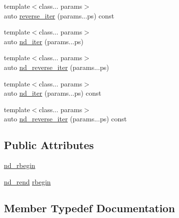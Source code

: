 \begin{DoxyCompactItemize}
\item 
{\footnotesize template$<$class... params$>$ }\\auto \hyperlink{classBC_1_1tensors_1_1Tensor__IterAlgos_abbc5cde5739934f3a303e2cbd03e95c5}{reverse\+\_\+iter} (params...\+ps) const 
\item 
{\footnotesize template$<$class... params$>$ }\\auto \hyperlink{classBC_1_1tensors_1_1Tensor__IterAlgos_a31a31f7f95cda12e59c24e9c483a1a70}{nd\+\_\+iter} (params...\+ps)
\item 
{\footnotesize template$<$class... params$>$ }\\auto \hyperlink{classBC_1_1tensors_1_1Tensor__IterAlgos_a309a1ae284a823c894b23f9628b62764}{nd\+\_\+reverse\+\_\+iter} (params...\+ps)
\item 
{\footnotesize template$<$class... params$>$ }\\auto \hyperlink{classBC_1_1tensors_1_1Tensor__IterAlgos_ab57a2a84cd09e5194ba77f65d9f3e8eb}{nd\+\_\+iter} (params...\+ps) const 
\item 
{\footnotesize template$<$class... params$>$ }\\auto \hyperlink{classBC_1_1tensors_1_1Tensor__IterAlgos_a92d3da0f0eafc846e9eb079e3347f6eb}{nd\+\_\+reverse\+\_\+iter} (params...\+ps) const 
\end{DoxyCompactItemize}
\subsection*{Public Attributes}
\begin{DoxyCompactItemize}
\item 
\hyperlink{classBC_1_1tensors_1_1Tensor__IterAlgos_a23ce58f5b1563c197ed95719914d4a46}{nd\+\_\+rbegin}
\item 
\hyperlink{classBC_1_1tensors_1_1Tensor__IterAlgos_a8109154106e723b1957c6c22e14ab9b5}{nd\+\_\+rend} \hyperlink{classBC_1_1tensors_1_1Tensor__IterAlgos_a10c1cb1d7095d33b9cc549aa44e98fec}{rbegin}
\end{DoxyCompactItemize}


\subsection{Member Typedef Documentation}
